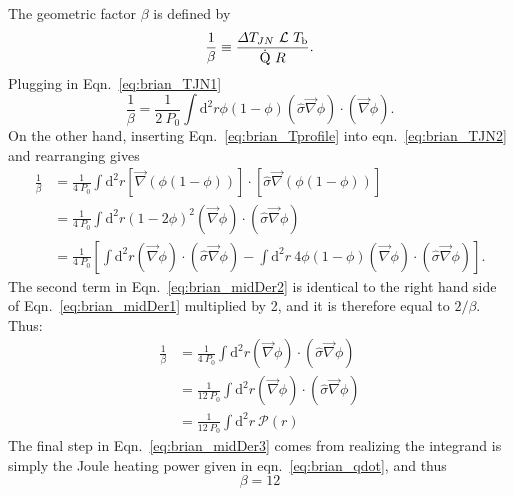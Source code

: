 The geometric factor $\beta$ is defined by
\begin{equation}
\frac{1}{\beta}\equiv\frac{\Delta T_{JN}~\mathcal{L}~T_\mathrm{b}}{\dot{\mathrm{Q}}~R}.
\end{equation}
Plugging in Eqn.~\ref{eq:brian_TJN1}
\begin{equation}
\frac{1}{\beta} = \frac{1}{2~P_0}\int\mathrm{d}^2r\phi(1-\phi)(\hat\sigma\vec\nabla\phi)\cdot(\vec\nabla\phi).
\label{eq:brian_midDer1}
\end{equation}
On the other hand, inserting Eqn.~\ref{eq:brian_Tprofile} into eqn.~\ref{eq:brian_TJN2} and rearranging gives
\begin{align}
\frac{1}{\beta} &= \frac{1}{4~P_0}\int\mathrm{d}^2r\left[\vec\nabla(\phi(1-\phi))\right]\cdot\left[\hat\sigma\vec\nabla(\phi(1-\phi))\right] \nonumber \\
&=\frac{1}{4~P_0}\int\mathrm{d}^2r(1-2\phi)^2(\vec\nabla\phi)\cdot(\hat\sigma\vec\nabla\phi) \nonumber \\
&=\frac{1}{4~P_0}\left[\int\mathrm{d}^2r(\vec\nabla\phi)\cdot(\hat\sigma\vec\nabla\phi) - \int\mathrm{d}^2r~4\phi(1-\phi)(\vec\nabla\phi)\cdot(\hat\sigma\vec\nabla\phi)\right].\label{eq:brian_midDer2}
\end{align}
The second term in Eqn.~\ref{eq:brian_midDer2} is identical to the right hand side of Eqn.~\ref{eq:brian_midDer1} multiplied by 2, and it is therefore equal to $2/\beta$. Thus:
\begin{align}
\frac{1}{\beta} &= \frac{1}{4~P_0}\int\mathrm{d}^2r(\vec\nabla\phi)\cdot(\hat\sigma\vec\nabla\phi) \nonumber \\
&=\frac{1}{12~P_0}\int\mathrm{d}^2r(\vec\nabla\phi)\cdot(\hat\sigma\vec\nabla\phi) \nonumber \\
&=\frac{1}{12~P_0}\int\mathrm{d}^2r~\mathcal{P}(r)\label{eq:brian_midDer3}
\end{align}
The final step in Eqn.~\ref{eq:brian_midDer3} comes from realizing the integrand is simply the Joule heating power given in eqn.~\ref{eq:brian_qdot}, and thus
\begin{equation}
\beta = 12
\end{equation}

